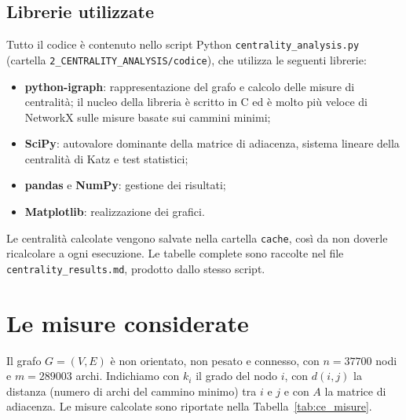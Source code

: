 \documentclass[11pt]{report}
\begin{document}
\subsection{Librerie utilizzate}
{\sloppy Tutto il codice è contenuto nello script Python
\texttt{centrality\_analysis.py} (cartella \texttt{2\_CENTRALITY\_ANALYSIS/codice}),
che utilizza le seguenti librerie:\par}
\begin{itemize}
  \item \textbf{python-igraph}: rappresentazione del grafo e calcolo delle misure
        di centralità; il nucleo della libreria è scritto in C ed è molto più
        veloce di NetworkX sulle misure basate sui cammini minimi;
  \item \textbf{SciPy}: autovalore dominante della matrice di adiacenza, sistema
        lineare della centralità di Katz e test statistici;
  \item \textbf{pandas} e \textbf{NumPy}: gestione dei risultati;
  \item \textbf{Matplotlib}: realizzazione dei grafici.
\end{itemize}
Le centralità calcolate vengono salvate nella cartella \texttt{cache}, così da non
doverle ricalcolare a ogni esecuzione. Le tabelle complete sono raccolte nel file
\texttt{centrality\_results.md}, prodotto dallo stesso script.

\section{Le misure considerate}
\label{sec:ce_misure}

Il grafo $G=(V,E)$ è non orientato, non pesato e connesso, con $n=\num{37700}$
nodi e $m=\num{289003}$ archi. Indichiamo con $k_i$ il grado del nodo $i$, con
$d(i,j)$ la distanza (numero di archi del cammino minimo) tra $i$ e $j$ e con $A$
la matrice di adiacenza. Le misure calcolate sono riportate nella
Tabella~\ref{tab:ce_misure}.
\end{document}
